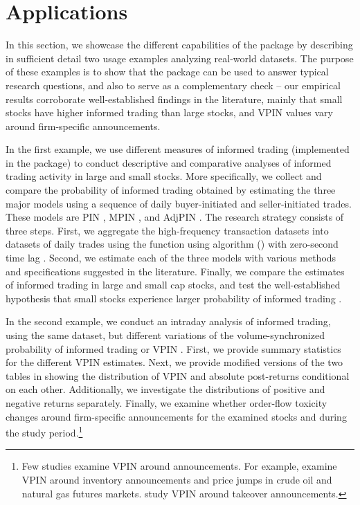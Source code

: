 \section{Applications}

In this section, we showcase the different capabilities of the package by describing in sufficient detail two usage examples analyzing real-world datasets. The purpose of these examples is to show that the package can be used to answer typical research questions, and also to serve as a complementary check – our empirical results corroborate well-established findings in the literature, mainly that small stocks have higher informed trading than large stocks, and VPIN values vary around firm-specific announcements.

In the first example, we use different measures of informed trading (implemented in the package) to conduct descriptive and comparative analyses of informed trading activity in large and small stocks. More specifically, we collect and compare the probability of informed trading obtained by estimating the three major models using a sequence of daily buyer-initiated and seller-initiated trades. 
These models are PIN \citep{easley1992time,easley1996liquidity}, MPIN \citep{ersan2016multilayer}, and AdjPIN \citep{duarte2009why}. The research strategy consists of three steps. First, we aggregate the high-frequency transaction datasets into datasets of daily trades using the function  using \cite{Lee1991Inferring} algorithm () with zero-second time lag . Second, we estimate each of the three models with various methods and specifications suggested in the literature. Finally, we compare the estimates of informed trading in  large and small cap stocks, and test the well-established hypothesis that small stocks experience larger probability of informed trading \citep[see e.g.][]{Easley2002Is,Aslan2011characteristics}.

In the second example, we conduct an intraday analysis of informed trading, using the same dataset, but different variations of the volume-synchronized probability of informed trading or VPIN \citep{Easley2011microstructure,Easley2012Flow}. First, we provide summary statistics for the different VPIN estimates. Next, we provide modified versions of the two tables in \cite{Easley2011microstructure} showing the distribution of VPIN and absolute post-returns conditional on each other. Additionally, we  investigate the distributions of positive and negative returns separately.
Finally, we examine whether order-flow toxicity changes around firm-specific announcements for the examined stocks and during the study period.\footnote{Few studies examine VPIN around announcements. For example, \cite{Bjursell2017VPIN} examine VPIN around inventory announcements and price jumps in crude oil and natural gas futures markets. \cite{Bugeja2015microstructure} study VPIN around takeover announcements.} 


